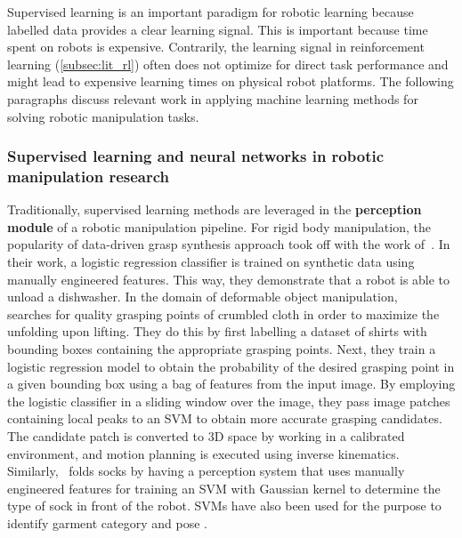 \documentclass[\home/main.tex]{subfiles}
\begin{document}


Supervised learning is an important paradigm for robotic learning because labelled data provides a clear learning signal. This is important because time spent on robots is expensive. Contrarily, the learning signal in reinforcement learning (\cref{subsec:lit_rl}) often does not optimize for direct task performance and might lead to expensive learning times on physical robot platforms. The following paragraphs discuss relevant work in applying machine learning methods for solving robotic manipulation tasks. 

\subsubsection{Supervised learning and neural networks in robotic manipulation research}
Traditionally, supervised learning methods are leveraged in the \textbf{perception module} of a robotic manipulation pipeline. For rigid body manipulation, the popularity of data-driven grasp synthesis approach took off with the work of~\textcite{Saxena2008}. In their work, a logistic regression classifier is trained on synthetic data using manually engineered features. This way, they demonstrate that a robot is able to unload a dishwasher. In the domain of deformable object manipulation, ~\textcite{Ramisa2012} searches for quality grasping points of crumbled cloth in order to maximize the unfolding upon lifting. They do this by first labelling a dataset of shirts with bounding boxes containing the appropriate grasping points. Next, they train a logistic regression model to obtain the probability of the desired grasping point in a given bounding box using a bag of features from the input image. By employing the logistic classifier in a sliding window over the image, they pass image patches containing local peaks to an \gls{SVM} to obtain more accurate grasping candidates. The candidate patch is converted to 3D space by working in a calibrated environment, and motion planning is executed using inverse kinematics. Similarly,~\textcite{Wang2011} folds socks by having a perception system that uses manually engineered features for training an \gls{SVM} with Gaussian kernel to determine the type of sock in front of the robot. \Glspl{SVM} have also been used for the purpose to identify garment category and pose \autocite{Li2014, li2014volum}.
\end{document}
